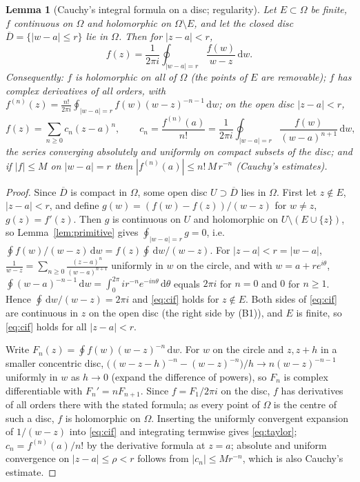 \documentclass[11pt]{article}
\newtheorem{lemma}[theorem]{Lemma}
\theoremstyle{definition}
\newcommand{\dd}{\,\mathrm{d}}
\begin{document}
\begin{lemma}[Cauchy's integral formula on a disc; regularity]\label{lem:cauchy-disc}
Let $E\subset\Omega$ be finite, $f$ continuous on $\Omega$ and holomorphic on $\Omega\setminus E$, and let the closed disc $\overline D=\{|w-a|\le r\}$ lie in $\Omega$. Then for $|z-a|<r$,
\begin{equation}\label{eq:cif}
f(z)=\frac1{2\pi i}\oint_{|w-a|=r}\frac{f(w)}{w-z}\dd w .
\end{equation}
Consequently: $f$ is holomorphic on all of $\Omega$ (the points of $E$ are removable); $f$ has complex derivatives of all orders, with
$f^{(n)}(z)=\frac{n!}{2\pi i}\oint_{|w-a|=r}f(w)(w-z)^{-n-1}\dd w$; on the open disc $|z-a|<r$,
\begin{equation}\label{eq:taylor}
f(z)=\sum_{n\ge0}c_n(z-a)^{n},\qquad c_n=\frac{f^{(n)}(a)}{n!}=\frac1{2\pi i}\oint_{|w-a|=r}\frac{f(w)}{(w-a)^{n+1}}\dd w,
\end{equation}
the series converging absolutely and uniformly on compact subsets of the disc; and if $|f|\le M$ on $|w-a|=r$ then $|f^{(n)}(a)|\le n!\,M\,r^{-n}$ (Cauchy's estimates).
\end{lemma}
\begin{proof}
Since $\overline D$ is compact in $\Omega$, some open disc $U\supset\overline D$ lies in $\Omega$.
First let $z\notin E$, $|z-a|<r$, and define $g(w)=(f(w)-f(z))/(w-z)$ for $w\ne z$, $g(z)=f'(z)$.
Then $g$ is continuous on $U$ and holomorphic on $U\setminus(E\cup\{z\})$, so Lemma~\ref{lem:primitive} gives $\oint_{|w-a|=r}g=0$, i.e.\ $\oint f(w)/(w-z)\dd w=f(z)\oint\dd w/(w-z)$.
For $|z-a|<r=|w-a|$, $\frac1{w-z}=\sum_{n\ge0}\frac{(z-a)^{n}}{(w-a)^{n+1}}$ uniformly in $w$ on the circle, and with $w=a+re^{i\theta}$,
$\oint(w-a)^{-n-1}\dd w=\int_0^{2\pi}ir^{-n}e^{-in\theta}\dd\theta$ equals $2\pi i$ for $n=0$ and $0$ for $n\ge1$. Hence $\oint\dd w/(w-z)=2\pi i$ and \eqref{eq:cif} holds for $z\notin E$.
Both sides of \eqref{eq:cif} are continuous in $z$ on the open disc (the right side by (B1)), and $E$ is finite, so \eqref{eq:cif} holds for all $|z-a|<r$.

Write $F_n(z)=\oint f(w)(w-z)^{-n}\dd w$. For $w$ on the circle and $z,z+h$ in a smaller concentric disc, $\bigl((w-z-h)^{-n}-(w-z)^{-n}\bigr)/h\to n(w-z)^{-n-1}$ uniformly in $w$ as $h\to0$ (expand the difference of powers), so $F_n$ is complex differentiable with $F_n'=nF_{n+1}$.
Since $f=F_1/2\pi i$ on the disc, $f$ has derivatives of all orders there with the stated formula; as every point of $\Omega$ is the centre of such a disc, $f$ is holomorphic on $\Omega$.
Inserting the uniformly convergent expansion of $1/(w-z)$ into \eqref{eq:cif} and integrating termwise gives \eqref{eq:taylor}; $c_n=f^{(n)}(a)/n!$ by the derivative formula at $z=a$; absolute and uniform convergence on $|z-a|\le\rho<r$ follows from $|c_n|\le Mr^{-n}$, which is also Cauchy's estimate.
\end{proof}
\end{document}
